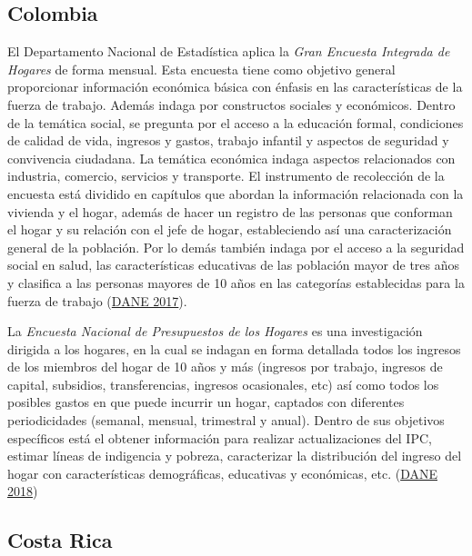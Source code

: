\documentclass[
  12pt,
  spanish,
]{book}
\begin{document}
\hypertarget{colombia}{%
\subsection*{Colombia}\label{colombia}}

El Departamento Nacional de Estadística aplica la \emph{Gran Encuesta Integrada de Hogares} de forma mensual. Esta encuesta tiene como objetivo general proporcionar información económica básica con énfasis en las características de la fuerza de trabajo. Además indaga por constructos sociales y económicos. Dentro de la temática social, se pregunta por el acceso a la educación formal, condiciones de calidad de vida, ingresos y gastos, trabajo infantil y aspectos de seguridad y convivencia ciudadana. La temática económica indaga aspectos relacionados con industria, comercio, servicios y transporte. El instrumento de recolección de la encuesta está dividido en capítulos que abordan la información relacionada con la vivienda y el hogar, además de hacer un registro de las personas que conforman el hogar y su relación con el jefe de hogar, estableciendo así una caracterización general de la población. Por lo demás también indaga por el acceso a la seguridad social en salud, las características educativas de las población mayor de tres años y clasifica a las personas mayores de 10 años en las categorías establecidas para la fuerza de trabajo (\protect\hyperlink{ref-DANE-COL_2017}{DANE 2017}).

La \emph{Encuesta Nacional de Presupuestos de los Hogares} es una investigación dirigida a los hogares, en la cual se indagan en forma detallada todos los ingresos de los miembros del hogar de 10 años y más (ingresos por trabajo, ingresos de capital, subsidios, transferencias, ingresos ocasionales, etc) así como todos los posibles gastos en que puede incurrir un hogar, captados con diferentes periodicidades (semanal, mensual, trimestral y anual). Dentro de sus objetivos específicos está el obtener información para realizar actualizaciones del IPC, estimar líneas de indigencia y pobreza, caracterizar la distribución del ingreso del hogar con características demográficas, educativas y económicas, etc. (\protect\hyperlink{ref-DANE-COL_2018}{DANE 2018})

\hypertarget{costa-rica}{%
\subsection*{Costa Rica}\label{costa-rica}}
\end{document}
